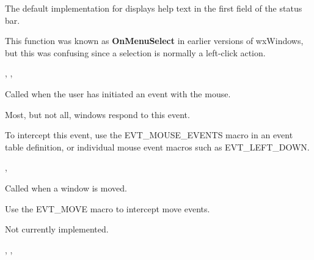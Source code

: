 The default implementation for  displays help
text in the first field of the status bar.

This function was known as {\bf OnMenuSelect} in earlier versions of wxWindows, but this was confusing
since a selection is normally a left-click action.


,\rtfsp
{},\rtfsp
{}


\label{wxwindowonmouseevent}


Called when the user has initiated an event with the
mouse.




Most, but not all, windows respond to this event.

To intercept this event, use the EVT\_MOUSE\_EVENTS macro in an event table definition, or individual
mouse event macros such as EVT\_LEFT\_DOWN.


,\rtfsp
{}

\label{wxwindowonmove}


Called when a window is moved.




Use the EVT\_MOVE macro to intercept move events.


Not currently implemented.


,\rtfsp
{},\rtfsp
{}

